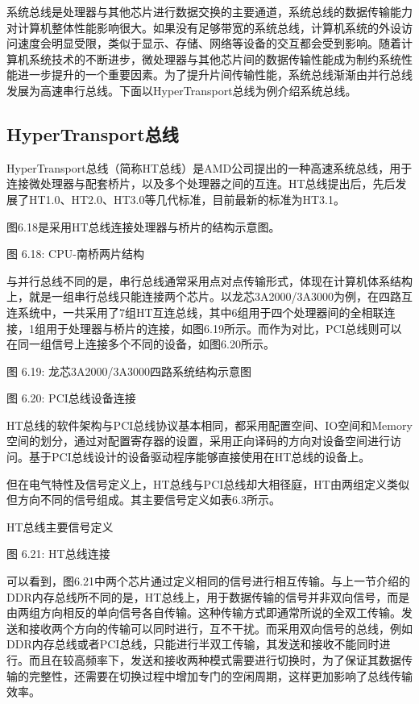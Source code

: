 \documentclass[]{ctexbook}
\begin{document}
系统总线是处理器与其他芯片进行数据交换的主要通道，系统总线的数据传输能力对计算机整体性能影响很大。如果没有足够带宽的系统总线，计算机系统的外设访问速度会明显受限，类似于显示、存储、网络等设备的交互都会受到影响。随着计算机系统技术的不断进步，微处理器与其他芯片间的数据传输性能成为制约系统性能进一步提升的一个重要因素。为了提升片间传输性能，系统总线渐渐由并行总线发展为高速串行总线。下面以HyperTransport总线为例介绍系统总线。

\hypertarget{hypertransportux603bux7ebf}{%
\subsection{HyperTransport总线}\label{hypertransportux603bux7ebf}}

HyperTransport总线（简称HT总线）是AMD公司提出的一种高速系统总线，用于连接微处理器与配套桥片，以及多个处理器之间的互连。HT总线提出后，先后发展了HT1.0、HT2.0、HT3.0等几代标准，目前最新的标准为HT3.1。

图6.18是采用HT总线连接处理器与桥片的结构示意图。

图 6.18: CPU-南桥两片结构

与并行总线不同的是，串行总线通常采用点对点传输形式，体现在计算机体系结构上，就是一组串行总线只能连接两个芯片。以龙芯3A2000/3A3000为例，在四路互连系统中，一共采用了7组HT互连总线，其中6组用于四个处理器间的全相联连接，1组用于处理器与桥片的连接，如图6.19所示。而作为对比，PCI总线则可以在同一组信号上连接多个不同的设备，如图6.20所示。

图 6.19: 龙芯3A2000/3A3000四路系统结构示意图

图 6.20: PCI总线设备连接

HT总线的软件架构与PCI总线协议基本相同，都采用配置空间、IO空间和Memory空间的划分，通过对配置寄存器的设置，采用正向译码的方向对设备空间进行访问。基于PCI总线设计的设备驱动程序能够直接使用在HT总线的设备上。

但在电气特性及信号定义上，HT总线与PCI总线却大相径庭，HT由两组定义类似但方向不同的信号组成。其主要信号定义如表6.3所示。

\label{tab:ht-signals}HT总线主要信号定义

图 6.21: HT总线连接

可以看到，图6.21中两个芯片通过定义相同的信号进行相互传输。与上一节介绍的DDR内存总线所不同的是，HT总线上，用于数据传输的信号并非双向信号，而是由两组方向相反的单向信号各自传输。这种传输方式即通常所说的全双工传输。发送和接收两个方向的传输可以同时进行，互不干扰。而采用双向信号的总线，例如DDR内存总线或者PCI总线，只能进行半双工传输，其发送和接收不能同时进行。而且在较高频率下，发送和接收两种模式需要进行切换时，为了保证其数据传输的完整性，还需要在切换过程中增加专门的空闲周期，这样更加影响了总线传输效率。
\end{document}
